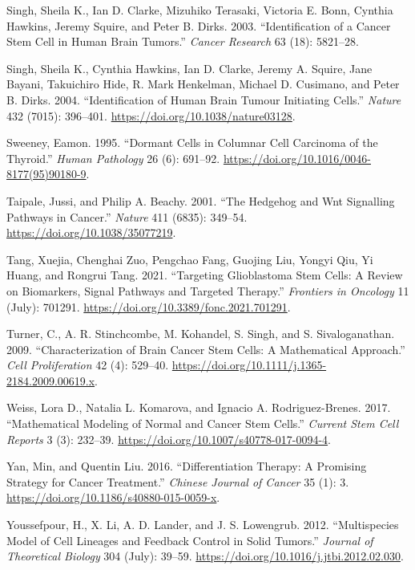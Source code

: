 \documentclass[
  letterpaper,
]{scrreprt}
\newlength{\cslhangindent}
\newenvironment{CSLReferences}[2] %
 {\begin{list}{}{%
  \setlength{\itemindent}{0pt}
  \setlength{\leftmargin}{0pt}
  \setlength{\parsep}{0pt}
  \ifodd #1
   \setlength{\leftmargin}{\cslhangindent}
   \setlength{\itemindent}{-1\cslhangindent}
  \fi
  \setlength{\itemsep}{#2\baselineskip}}}
 {\end{list}}
\theoremstyle{definition}
\theoremstyle{remark}
\begin{document}
\begin{CSLReferences}{1}{0}
Singh, Sheila K., Ian D. Clarke, Mizuhiko Terasaki, Victoria E. Bonn,
Cynthia Hawkins, Jeremy Squire, and Peter B. Dirks. 2003.
{``Identification of a Cancer Stem Cell in Human Brain Tumors.''}
\emph{Cancer Research} 63 (18): 5821--28.

Singh, Sheila K., Cynthia Hawkins, Ian D. Clarke, Jeremy A. Squire, Jane
Bayani, Takuichiro Hide, R. Mark Henkelman, Michael D. Cusimano, and
Peter B. Dirks. 2004. {``Identification of Human Brain Tumour Initiating
Cells.''} \emph{Nature} 432 (7015): 396--401.
\url{https://doi.org/10.1038/nature03128}.

Sweeney, Eamon. 1995. {``Dormant Cells in Columnar Cell Carcinoma of the
Thyroid.''} \emph{Human Pathology} 26 (6): 691--92.
\url{https://doi.org/10.1016/0046-8177(95)90180-9}.

Taipale, Jussi, and Philip A. Beachy. 2001. {``The Hedgehog and Wnt
Signalling Pathways in Cancer.''} \emph{Nature} 411 (6835): 349--54.
\url{https://doi.org/10.1038/35077219}.

Tang, Xuejia, Chenghai Zuo, Pengchao Fang, Guojing Liu, Yongyi Qiu, Yi
Huang, and Rongrui Tang. 2021. {``Targeting Glioblastoma Stem Cells: A
Review on Biomarkers, Signal Pathways and Targeted Therapy.''}
\emph{Frontiers in Oncology} 11 (July): 701291.
\url{https://doi.org/10.3389/fonc.2021.701291}.

Turner, C., A. R. Stinchcombe, M. Kohandel, S. Singh, and S.
Sivaloganathan. 2009. {``Characterization of Brain Cancer Stem Cells: A
Mathematical Approach.''} \emph{Cell Proliferation} 42 (4): 529--40.
\url{https://doi.org/10.1111/j.1365-2184.2009.00619.x}.

Weiss, Lora D., Natalia L. Komarova, and Ignacio A. Rodriguez-Brenes.
2017. {``Mathematical Modeling of Normal and Cancer Stem Cells.''}
\emph{Current Stem Cell Reports} 3 (3): 232--39.
\url{https://doi.org/10.1007/s40778-017-0094-4}.

Yan, Min, and Quentin Liu. 2016. {``Differentiation Therapy: A Promising
Strategy for Cancer Treatment.''} \emph{Chinese Journal of Cancer} 35
(1): 3. \url{https://doi.org/10.1186/s40880-015-0059-x}.

Youssefpour, H., X. Li, A. D. Lander, and J. S. Lowengrub. 2012.
{``Multispecies Model of Cell Lineages and Feedback Control in Solid
Tumors.''} \emph{Journal of Theoretical Biology} 304 (July): 39--59.
\url{https://doi.org/10.1016/j.jtbi.2012.02.030}.

\end{CSLReferences}
\end{document}

